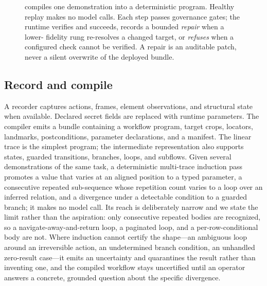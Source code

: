 \begin{figure}[t]
\caption{\system{} compiles one demonstration into a deterministic program.
Healthy replay makes no model calls. Each step passes governance gates; the
runtime verifies and succeeds, records a bounded \emph{repair} when a lower-
fidelity rung re-resolves a changed target, or \emph{refuses} when a configured
check cannot be verified. A repair is an auditable patch, never a silent
overwrite of the deployed bundle.}
\label{fig:pipeline}
\end{figure}

\subsection{Record and compile}
A recorder captures actions, frames, element observations, and structural state
when available. Declared secret fields are replaced with runtime parameters.
The compiler emits a bundle containing a workflow program, target crops,
locators, landmarks, postconditions, parameter declarations, and a manifest.
The linear trace is the simplest program; the intermediate representation also
supports states, guarded transitions, branches, loops, and subflows. Given
several demonstrations of the same task, a deterministic multi-trace induction
pass promotes a value that varies at an aligned position to a typed parameter, a
consecutive repeated sub-sequence whose repetition count varies to a loop over an
inferred relation, and a divergence under a detectable condition to a guarded
branch; it makes no model call. Its reach is deliberately narrow and we state
the limit rather than the aspiration: only consecutive repeated bodies are
recognized, so a navigate-away-and-return loop, a paginated loop, and a
per-row-conditional body are not. Where induction cannot certify the shape---an
ambiguous loop around an irreversible action, an undetermined branch condition,
an unhandled zero-result case---it emits an uncertainty and quarantines the
result rather than inventing one, and the compiled workflow stays uncertified
until an operator answers a concrete, grounded question about the specific
divergence.

